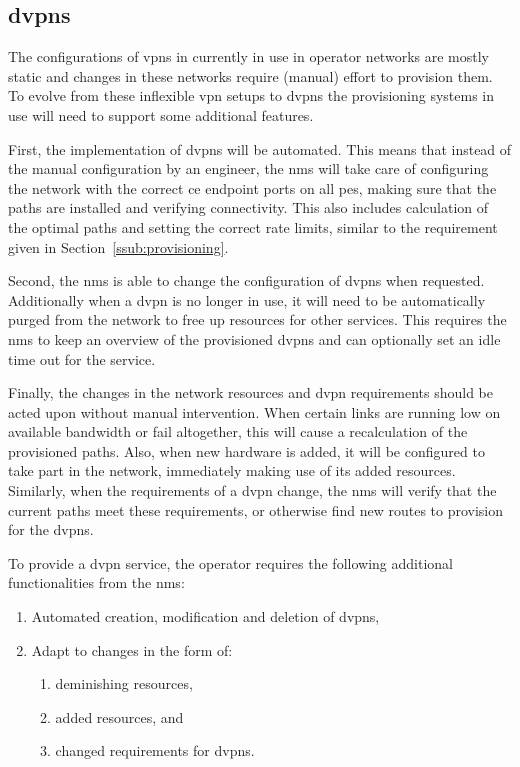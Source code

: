 



\subsection{\acsp{dvpn}} %
\label{sub:dvpn}

The configurations of \acp{vpn} in currently in use in operator networks are mostly static and changes in these networks require (manual) effort to provision them. To evolve from these inflexible \ac{vpn} setups to \aclp{dvpn} the provisioning systems in use will need to support some additional features.

First, the implementation of \acp{dvpn} will be automated. This means that instead of the manual configuration by an engineer, the \ac{nms} will take care of configuring the network with the correct \ac{ce} endpoint ports on all \acp{pe}, making sure that the paths are installed and verifying connectivity. This also includes calculation of the optimal paths and setting the correct rate limits, similar to the requirement given in Section~\ref{ssub:provisioning}.

Second, the \ac{nms} is able to change the configuration of \acp{dvpn} when requested. Additionally when a \ac{dvpn} is no longer in use, it will need to be automatically purged from the network to free up resources for other services. This requires the \ac{nms} to keep an overview of the provisioned \acp{dvpn} and can optionally set an idle time out for the service.

Finally, the changes in the network resources and \ac{dvpn} requirements should be acted upon without manual intervention. When certain links are running low on available bandwidth or fail altogether, this will cause a recalculation of the provisioned paths. Also, when new hardware is added, it will be configured to take part in the network, immediately making use of its added resources. Similarly, when the requirements of a \ac{dvpn} change, the \ac{nms} will verify that the current paths meet these requirements, or otherwise find new routes to provision for the \acp{dvpn}.

To provide a \ac{dvpn} service, the operator requires the following additional functionalities from the \ac{nms}:

\begin{enumerate}
	\item Automated creation, modification and deletion of \acp{dvpn},
	\item Adapt to changes in the form of:
	\begin{enumerate}
		\item deminishing resources,
		\item added resources, and
		\item changed requirements for \acp{dvpn}.
	\end{enumerate} 
\end{enumerate}


